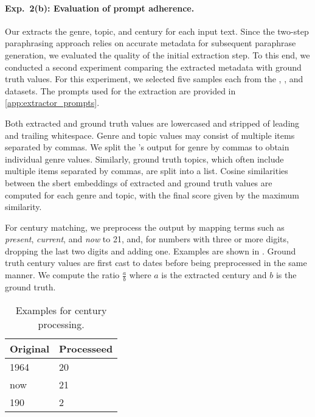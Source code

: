 \paragraph{Exp.\ 2(b): Evaluation of prompt adherence.}

Our \pextractor{} extracts the genre, topic, and century for each input text. 
Since the two-step paraphrasing approach relies on accurate metadata for subsequent paraphrase generation, we evaluated the quality of the initial extraction step. 
To this end, we conducted a second experiment comparing the extracted metadata with ground truth values. 
For this experiment, we selected five samples each from the \dataBlog{}, \dataGutenberg{}, and \dataStudent{} datasets.
The prompts used for the extraction are provided in \autoref{app:extractor_prompts}.

Both extracted and ground truth values are lowercased and stripped of leading and trailing whitespace. 
Genre and topic values may consist of multiple items separated by commas. 
We split the \pextractor{}'s output for genre by commas to obtain individual genre values. 
Similarly, ground truth topics, which often include multiple items separated by commas, are split into a list. 
Cosine similarities between the \ac{sbert} embeddings of extracted and ground truth values are computed for each genre and topic, with the final score given by the maximum similarity.

For century matching, we preprocess the \pextractor{} output by mapping terms such as \textit{present}, \textit{current}, and \textit{now} to 21, and, for numbers with three or more digits, dropping the last two digits and adding one. 
Examples are shown in . 
Ground truth century values are first cast to dates before being preprocessed in the same manner.
We compute the ratio $\frac{a}{b}$ where $a$ is the extracted century and $b$ is the ground truth.

\begin{table}[h]
\centering
\caption[Examples for century processing]{Examples for century processing.}
\label{tab:examples_extract_century}
\begin{tabular}{@{}ll@{}}
    \toprule
\textbf{Original} & \textbf{Processeed} \\
\midrule
1964              & 20                  \\
now               & 21                  \\
190               & 2     \\
\bottomrule             
\end{tabular}%
\end{table}

